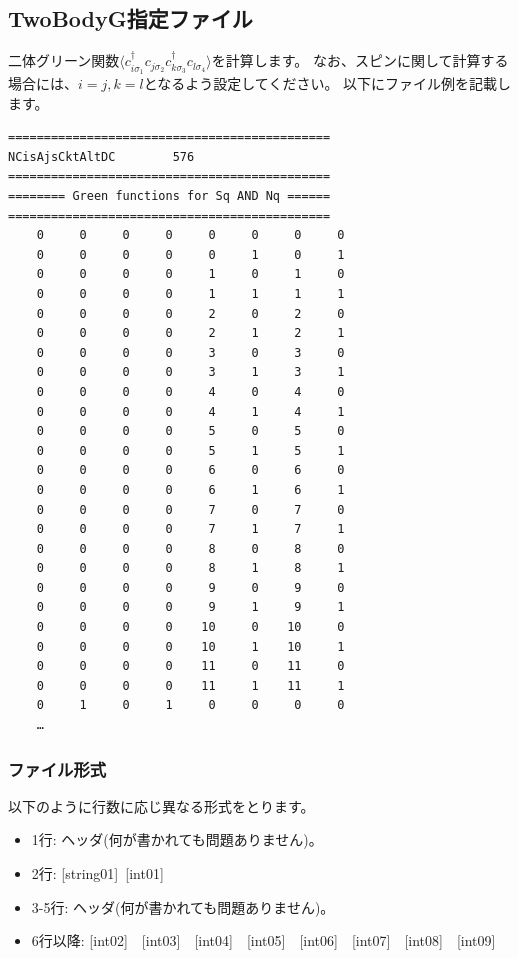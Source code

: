 \newpage
\subsection{TwoBodyG指定ファイル}
\label{Subsec:twobodyg}
二体グリーン関数$\langle c_{i\sigma_1}^{\dagger}c_{j\sigma_2}c_{k\sigma_3}^{\dagger}c_{l\sigma_4}\rangle$を計算します。
{なお、スピンに関して計算する場合には、$i=j, k=l$となるよう設定してください。}
以下にファイル例を記載します。

\begin{minipage}{12.5cm}
\begin{screen}
\begin{verbatim}
=============================================
NCisAjsCktAltDC        576
=============================================
======== Green functions for Sq AND Nq ======
=============================================
    0     0     0     0     0     0     0     0
    0     0     0     0     0     1     0     1
    0     0     0     0     1     0     1     0
    0     0     0     0     1     1     1     1
    0     0     0     0     2     0     2     0
    0     0     0     0     2     1     2     1
    0     0     0     0     3     0     3     0
    0     0     0     0     3     1     3     1
    0     0     0     0     4     0     4     0
    0     0     0     0     4     1     4     1
    0     0     0     0     5     0     5     0
    0     0     0     0     5     1     5     1
    0     0     0     0     6     0     6     0
    0     0     0     0     6     1     6     1
    0     0     0     0     7     0     7     0
    0     0     0     0     7     1     7     1
    0     0     0     0     8     0     8     0
    0     0     0     0     8     1     8     1
    0     0     0     0     9     0     9     0
    0     0     0     0     9     1     9     1
    0     0     0     0    10     0    10     0
    0     0     0     0    10     1    10     1
    0     0     0     0    11     0    11     0
    0     0     0     0    11     1    11     1
    0     1     0     1     0     0     0     0
    …
\end{verbatim}
\end{screen}
\end{minipage}

\subsubsection{ファイル形式}
以下のように行数に応じ異なる形式をとります。
 \begin{itemize}
   \item  1行:  ヘッダ(何が書かれても問題ありません)。
   \item  2行:   [string01]~[int01]
   \item  3-5行:  ヘッダ(何が書かれても問題ありません)。
   \item  6行以降: [int02]~~[int03]~~[int04]~~[int05]~~[int06]~~[int07]~~[int08]~~[int09]
  \end{itemize}
